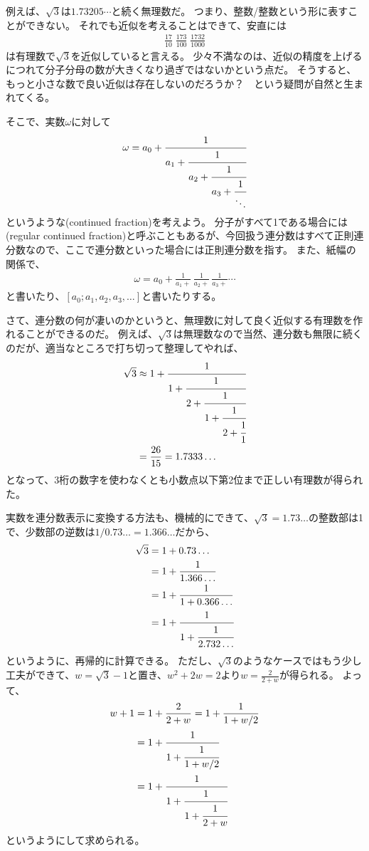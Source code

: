 例えば、$\sqrt{3}$は$1.73205\cdots$と続く無理数だ。
つまり、整数/整数という形に表すことができない。
それでも近似を考えることはできて、安直には
\begin{align*}
\frac{17}{10} \; \frac{173}{100} \; \frac{1732}{1000}
\end{align*}
は有理数で$\sqrt{3}$を近似していると言える。
少々不満なのは、近似の精度を上げるにつれて分子分母の数が大きくなり過ぎではないかという点だ。
そうすると、もっと小さな数で良い近似は存在しないのだろうか？　という疑問が自然と生まれてくる。

そこで、実数$\omega$に対して
\begin{align*}
\omega = a_0 + \cfrac{1}{a_1 + \cfrac{1}{a_2 + \cfrac{1}{a_3 + \cfrac{1}{\ddots}}}}
\end{align*}
というような(continued fraction)を考えよう。
分子がすべて1である場合には(regular continued fraction)と呼ぶこともあるが、今回扱う連分数はすべて正則連分数なので、ここで連分数といった場合には正則連分数を指す。
また、紙幅の関係で、
\begin{align*}
\omega=a_0 +\frac{1}{a_1 +}\, \frac{1}{a_2 +}\, \frac{1}{a_3 +}\cdots
\end{align*}
と書いたり、$[a_0;a_1,a_2,a_3,\ldots]$と書いたりする。

さて、連分数の何が凄いのかというと、無理数に対して良く近似する有理数を作れることができるのだ。
例えば、$\sqrt{3}$は無理数なので当然、連分数も無限に続くのだが、適当なところで打ち切って整理してやれば、
\begin{align*}
\sqrt{3} &\approx 1 + \cfrac{1}{1 + \cfrac{1}{2 + \cfrac{1}{1 + \cfrac{1}{2 + \cfrac{1}{1}}}}}\\
&=\frac{26}{15} = 1.7333\ldots
\end{align*}
となって、3桁の数字を使わなくとも小数点以下第2位まで正しい有理数が得られた。

実数を連分数表示に変換する方法も、機械的にできて、$\sqrt{3}=1.73\ldots$の整数部は1で、少数部の逆数は$1/0.73\ldots=1.366\ldots$だから、
\begin{align*}
\sqrt{3} &= 1 + 0.73\ldots\\
&= 1 + \frac{1}{1.366\ldots}\\
&= 1 + \frac{1}{1 + 0.366\ldots}\\
&= 1 + \cfrac{1}{1 + \cfrac{1}{2.732\ldots}}
\end{align*}
というように、再帰的に計算できる。
ただし、$\sqrt{3}$のようなケースではもう少し工夫ができて、$w=\sqrt{3}-1$と置き、$w^2+2w=2$より$w=\frac{2}{2+w}$が得られる。
よって、
\begin{align*}
w + 1 &= 1 + \frac{2}{2+w} = 1 + \frac{1}{1 + w/2}\\
&= 1 + \cfrac{1}{1 + \cfrac{1}{1 + w/2}}\\
&= 1 + \cfrac{1}{1 + \cfrac{1}{1 + \cfrac{1}{2+w}}}
\end{align*}
というようにして求められる。


